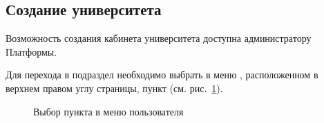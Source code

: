 \subsection{Создание университета}
Возможность создания кабинета университета доступна администратору Платформы. 

Для перехода в подраздел необходимо выбрать в меню , расположенном в верхнем правом углу страницы, пункт  (см. рис.~\ref{university:create_menu}).

		\begin{figure}[H]
		\caption{Выбор пункта  в меню пользователя}
		\label{university:create_menu}
		\end{figure}	
		
